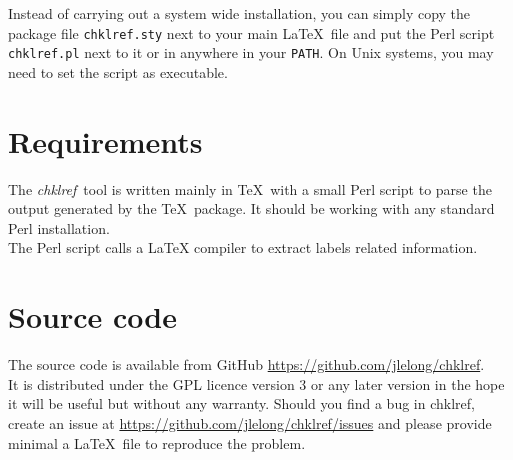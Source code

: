 \documentclass[a4paper,11pt,twoside]{article}
\def\chk{{\it chklref}}
\begin{document}
Instead of carrying out a system wide installation, you can simply copy the package file \verb!chklref.sty! next to your main \LaTeX\ file and put the Perl script \verb!chklref.pl! next to it or in anywhere in your \texttt{PATH}. On Unix systems, you may need to set the script as executable.


\section{Requirements}

The \chk\ tool is written mainly in \TeX\ with a small Perl script to parse the output generated by the \TeX\ package. It should be working with any standard Perl installation. \\

The Perl script calls a LaTeX compiler to extract labels related information.

\section{Source code}

The source code is available from GitHub \url{https://github.com/jlelong/chklref}. \\

It is distributed under the GPL licence version 3 or any later version in the hope it will be useful but without any warranty. Should you find a bug in chklref, create an issue at \url{https://github.com/jlelong/chklref/issues} and please provide minimal a \LaTeX\ file to reproduce the problem.
\end{document}
